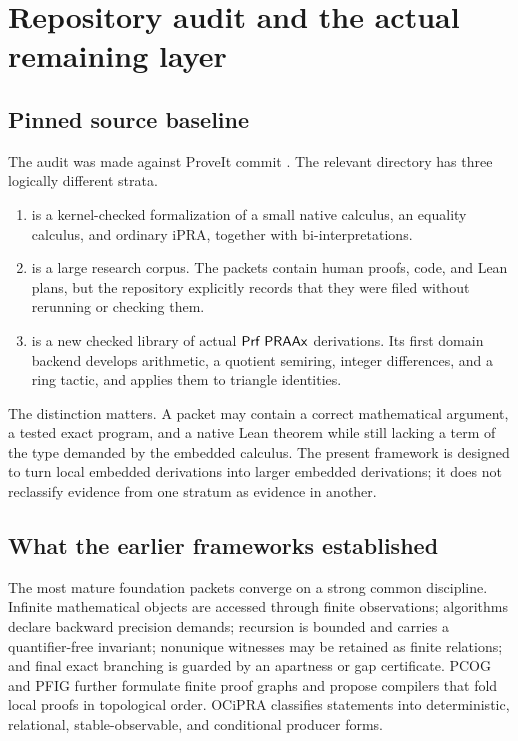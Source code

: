 \section{Repository audit and the actual remaining layer}

\subsection{Pinned source baseline}

The audit was made against ProveIt commit
.  The relevant directory has
three logically different strata.

\begin{enumerate}
\item {} is a kernel-checked formalization of a small native
calculus, an equality calculus, and ordinary iPRA, together with
bi-interpretations.
\item {} is a large research corpus.  The packets contain
human proofs, code, and Lean plans, but the repository explicitly records that
they were filed without rerunning or checking them.
\item {} is a new checked library of actual
\(\mathsf{Prf}\;\mathsf{PRAAx}\) derivations.  Its first domain backend develops arithmetic,
a quotient semiring, integer differences, and a ring tactic, and applies them
to triangle identities.
\end{enumerate}

The distinction matters.  A packet may contain a correct mathematical
argument, a tested exact program, and a native Lean theorem while still lacking
a term of the type demanded by the embedded calculus.  The present framework
is designed to turn local embedded derivations into larger embedded
derivations; it does not reclassify evidence from one stratum as evidence in
another.

\subsection{What the earlier frameworks established}

The most mature foundation packets converge on a strong common discipline.
Infinite mathematical objects are accessed through finite observations;
algorithms declare backward precision demands; recursion is bounded and carries
a quantifier-free invariant; nonunique witnesses may be retained as finite
relations; and final exact branching is guarded by an apartness or gap
certificate.  PCOG and PFIG further formulate finite proof graphs and propose
compilers that fold local proofs in topological order.  OCiPRA classifies
statements into deterministic, relational, stable-observable, and conditional
producer forms.

